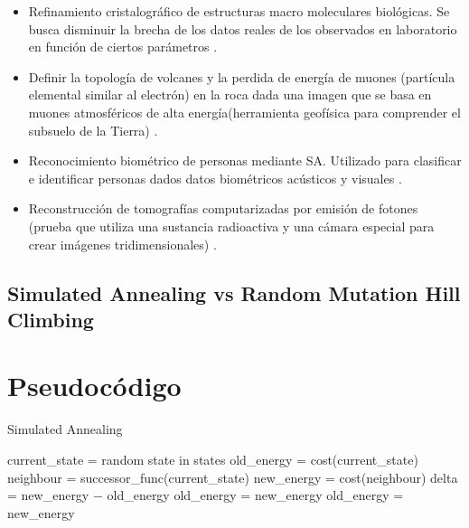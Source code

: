 \documentclass[12pt,twoside]{article}
\begin{document}
	\begin{itemize}
		\item Refinamiento cristalográfico de estructuras macro moleculares biológicas. Se busca disminuir la brecha de los datos reales de los observados en laboratorio en función de ciertos parámetros \cite{cristal}.
		
		\item Definir la topología de volcanes y la perdida de energía de muones (partícula elemental similar al electrón) en la roca dada una imagen que se basa en muones atmosféricos de alta energía(herramienta geofísica para comprender el subsuelo de la Tierra) \cite{volcan}.
		
		\item Reconocimiento biométrico de personas mediante SA. Utilizado para clasificar e identificar personas dados datos biométricos acústicos y visuales \cite{reconocimiento}. 
		
		\item Reconstrucción de tomografías computarizadas por emisión de fotones (prueba que utiliza una sustancia radioactiva y una cámara especial para crear imágenes tridimensionales) \cite{spect}. 
	\end{itemize}
	
\subsection[SA vs RMHC]{Simulated Annealing vs Random Mutation Hill Climbing}		

	
\clearpage
\section{Pseudocódigo}
		
	\begin{algorithm}[H]
		\caption{Simulated Annealing}
		\begin{algorithmic}[1]
			\State current\_state = random state in states 
			\State old\_energy = cost(current\_state) 
					\State neighbour = successor\_func(current\_state)
					\State new\_energy = cost(neighbour)
					\State delta = new\_energy $-$ old\_energy 
							\State old\_energy = new\_energy
						\EndIf
					\Else
						\State old\_energy = new\_energy
					\EndIf
				\EndFor 
			\EndFor
		\end{algorithmic}
		\label{alg:simulated_annealing}
	\end{algorithm}
		
\end{document}
